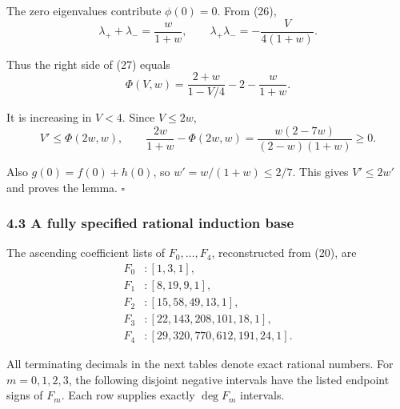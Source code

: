 \documentclass[
  11pt,
  a4paper,
]{article}
\begin{document}
The zero eigenvalues contribute \(\phi(0)=0\). From (26),
\nopagebreak
\[
\lambda_++\lambda_-=\frac{w}{1+w},\qquad
\lambda_+\lambda_-=-\frac{V}{4(1+w)}.
\]

Thus the right side of (27) equals
\nopagebreak
\[
\Phi(V,w)=\frac{2+w}{1-V/4}-2-\frac{w}{1+w}.
\]

It is increasing in \(V<4\). Since \(V\leq2w\),
\nopagebreak
\[
V'\leq\Phi(2w,w),\qquad
\frac{2w}{1+w}-\Phi(2w,w)
=\frac{w(2-7w)}{(2-w)(1+w)}\geq0.
\]

Also \(g(0)=f(0)+h(0)\), so \(w'=w/(1+w)\leq2/7\). This gives
\(V'\leq2w'\) and proves the lemma. \(\square\)

\subsubsection{4.3 A fully specified rational induction
base}\label{a-fully-specified-rational-induction-base}

The ascending coefficient lists of \(F_0,\ldots,F_4\), reconstructed
from (20), are
\nopagebreak
\[
\begin{aligned}
F_0 &: [1,3,1],\\
F_1 &: [8,19,9,1],\\
F_2 &: [15,58,49,13,1],\\
F_3 &: [22,143,208,101,18,1],\\
F_4 &: [29,320,770,612,191,24,1].
\end{aligned}\tag{28}
\]

All terminating decimals in the next tables denote exact rational
numbers. For \(m=0,1,2,3\), the following disjoint negative intervals
have the listed endpoint signs of \(F_m\). Each row supplies exactly
\(\deg F_m\) intervals.
\end{document}
